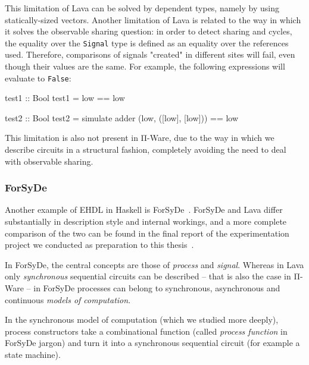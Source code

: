             This limitation of Lava can be solved by dependent types, namely by using statically-sized vectors.
            Another limitation of Lava is related to the way in which it solves the observable sharing question:
            in order to detect sharing and cycles, the equality over the \texttt{Signal} type is defined
            as an equality over the references used.
            Therefore, comparisons of signals "created" in different sites will fail,
            even though their values are the same.
            For example, the following expressions will evaluate to \texttt{False}:

            \begin{haskellcode}
        test1 :: Bool
        test1 = low == low

        test2 :: Bool
        test2 = simulate adder (low, ([low], [low])) == low
            \end{haskellcode}

            This limitation is also not present in Π-Ware, due to the way in which we describe circuits
            in a structural fashion, completely avoiding the need to deal with observable sharing.


            \subsubsection{ForSyDe}
            Another example of \ac{EHDL} in Haskell is ForSyDe~\cite{forsyde1999}.
            ForSyDe and Lava differ substantially in description style and internal workings,
            and a more complete comparison of the two can be found
            in the final report of the experimentation project we conducted
            as preparation to this thesis~\cite{functional-hardware-survey}.

            In ForSyDe, the central concepts are those of \emph{process} and \emph{signal}.
            Whereas in Lava only \emph{synchronous} sequential circuits can be described -- that is
            also the case in Π-Ware -- in ForSyDe processes can belong to synchronous,
            asynchronous and continuous \emph{models of computation}.

            In the synchronous model of computation (which we studied more deeply),
            process constructors take a combinational function (called \emph{process function} in
            ForSyDe jargon) and turn it into a synchronous sequential circuit
            (for example a state machine).

